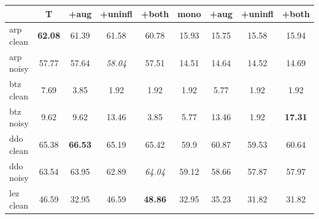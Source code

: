 \begin{table}[!tb]
    \centering
    \setlength{\tabcolsep}{8.pt}
    \begin{tabular}{l|cccc|cccc}
      \textbf{} & \textbf{T} & \textbf{+aug} & \textbf{+uninfl} & \textbf{+both} & \textbf{mono} &  \textbf{+aug} &
      \textbf{+uninfl} &
      \textbf{+both} \\ 
       \hline
      arp clean & \textbf{62.08} & 61.39 & 61.58          & 60.78 & 15.93 & 15.75 & 15.58 & 15.94 \\
      arp noisy & 57.77          & 57.64 & \textit{58.04} & 57.51 & 14.51 & 14.64 & 14.52 & 14.69 \\
      \hline
      btz clean & 7.69 & 3.85 & 1.92 & 1.92 & 1.92 & 5.77 & 1.92 & 1.92  \\
      btz noisy & 9.62 & 9.62 & 13.46 & 3.85 & 5.77 & 13.46 & 1.92 & \textbf{17.31}  \\
      \hline
      ddo clean & 65.38 & \textbf{66.53} & 65.19 & 65.42          & 59.9 & 60.87 & 59.53 & 60.64  \\
      ddo noisy & 63.54 & 63.95          & 62.89 & \textit{64.04} & 59.12 & 58.66 & 57.87 & 57.97 \\
      \hline
      lez clean & 46.59          & 32.95 & 46.59 & \textbf{48.86} & 32.95 & 35.23 & 31.82 & 31.82 \\

\end{tabular}
\end{table}
